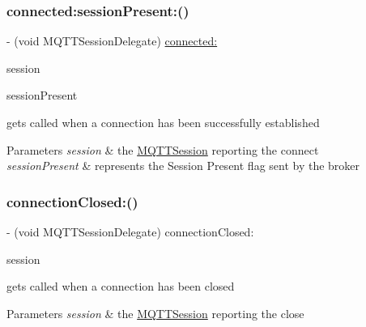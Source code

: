 \subsubsection{\texorpdfstring{connected\+:session\+Present\+:()}{connected:sessionPresent:()}}
{\footnotesize\ttfamily -\/ (void M\+Q\+T\+T\+Session\+Delegate) \hyperlink{protocol_m_q_t_t_session_delegate_01-p_a01fe0f17f1c6faca6c21227203e5fd55}{connected\+:} \begin{DoxyParamCaption}\item[{(\hyperlink{interface_m_q_t_t_session}{M\+Q\+T\+T\+Session} $\ast$)}]{session }\item[{sessionPresent:(B\+O\+OL)}]{session\+Present }\end{DoxyParamCaption}\hspace{0.3cm}{\ttfamily [optional]}}

gets called when a connection has been successfully established 
\begin{DoxyParams}{Parameters}
{\em session} & the \hyperlink{interface_m_q_t_t_session}{M\+Q\+T\+T\+Session} reporting the connect \\
\hline
{\em session\+Present} & represents the Session Present flag sent by the broker \\
\hline
\end{DoxyParams}
\mbox{\label{protocol_m_q_t_t_session_delegate_01-p_a6593d68033e6a0ceb424de60c357f035}} 
\subsubsection{\texorpdfstring{connection\+Closed\+:()}{connectionClosed:()}}
{\footnotesize\ttfamily -\/ (void M\+Q\+T\+T\+Session\+Delegate) connection\+Closed\+: \begin{DoxyParamCaption}\item[{(\hyperlink{interface_m_q_t_t_session}{M\+Q\+T\+T\+Session} $\ast$)}]{session }\end{DoxyParamCaption}\hspace{0.3cm}{\ttfamily [optional]}}

gets called when a connection has been closed 
\begin{DoxyParams}{Parameters}
{\em session} & the \hyperlink{interface_m_q_t_t_session}{M\+Q\+T\+T\+Session} reporting the close \\
\hline
\end{DoxyParams}
\mbox{\label{protocol_m_q_t_t_session_delegate_01-p_a2c72b0bfc17acb27ce12b9f7c4b879e8}} 
